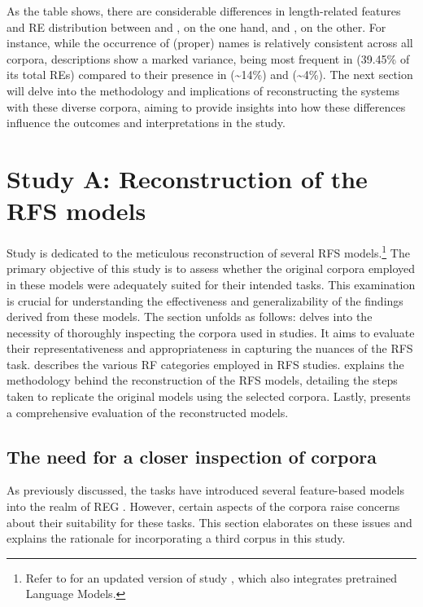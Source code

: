 As the table shows, there are considerable differences in length-related features and RE distribution between \msrcor and \negcor, on the one hand, and \wsj, on the other. For instance, while the occurrence of (proper) names is relatively consistent across all corpora, descriptions show a marked variance, being most frequent in \wsj (39.45\% of its total REs) compared to their presence in \msrcor (\sim14\%) and \negcor (\sim4\%). The next section will delve into the methodology and implications of reconstructing the \grec systems with these diverse corpora, aiming to provide insights into how these differences influence the outcomes and interpretations in the study.

\section{Study A: Reconstruction of the \grec RFS models}\label{sec:reconsturction}

Study \studA is dedicated to the meticulous reconstruction of several RFS models.\footnote{Refer to \citet{same-etal-2023-models} for an updated version of study \studA, which also integrates pretrained Language Models.} The primary objective of this study is to assess whether the original corpora employed in these models were adequately suited for their intended tasks. This examination is crucial for understanding the effectiveness and generalizability of the findings derived from these models. The section unfolds as follows:  delves into the necessity of thoroughly inspecting the corpora used in \context studies. It aims to evaluate their representativeness and appropriateness in capturing the nuances of the RFS task.  describes the various RF categories employed in RFS studies.  explains the methodology behind the reconstruction of the RFS models, detailing the steps taken to replicate the original models using the selected corpora. Lastly,  presents a comprehensive evaluation of the reconstructed models.

\subsection{The need for a closer inspection of \context corpora}\label{subsec:inspection}

As previously discussed, the \grec tasks have introduced several feature-based \context models into the realm of REG \citep{bohnet2008g,greenbacker2009udel,orasan-dornescu-2009-wlv}. However, certain aspects of the \grec corpora raise concerns about their suitability for these tasks. This section elaborates on these issues and explains the rationale for incorporating a third corpus in this study.

